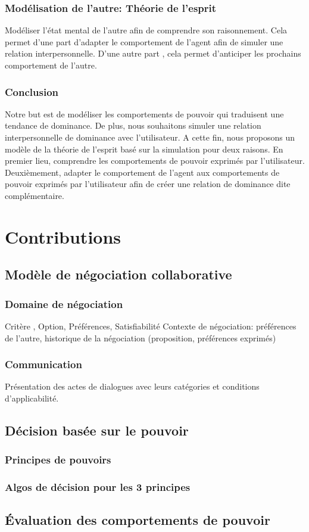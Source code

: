 \documentclass [french]{article}
\begin{document}
			\subsubsection{Modélisation de l'autre: Théorie de l'esprit} Modéliser l'état mental de l'autre afin de comprendre son raisonnement. Cela permet d'une part d'adapter le comportement de l'agent afin de simuler une relation interpersonnelle. D'une autre part , cela permet d'anticiper les prochains comportement de l'autre. 
		
		\subsubsection{Conclusion}
		
			Notre but est de modéliser les comportements de pouvoir qui traduisent une tendance de dominance. De plus, nous souhaitons simuler une relation interpersonnelle de dominance avec l'utilisateur. A cette fin, nous proposons un modèle de la théorie de l'esprit basé sur la simulation  pour deux raisons. En premier lieu, comprendre les comportements de pouvoir exprimés par l'utilisateur. Deuxièmement, adapter le comportement de l'agent aux comportements de pouvoir exprimés par l'utilisateur afin de créer une relation de dominance dite complémentaire. 	
			
	
	\section{Contributions}
		
		\subsection{Modèle de négociation collaborative}
			\subsubsection{Domaine de négociation }
				 Critère , Option, Préférences, Satisfiabilité
				Contexte de négociation: préférences de l'autre, historique de la négociation (proposition, préférences exprimés)
			
			\subsubsection{Communication}
			 Présentation des actes de dialogues avec leurs catégories et conditions d'applicabilité. 


		\subsection{Décision basée sur le pouvoir}
			\subsubsection{Principes de pouvoirs }
			
			\subsubsection{Algos de décision pour les 3 principes}
			
		\subsection{Évaluation des comportements de pouvoir}
			
\end{document}
